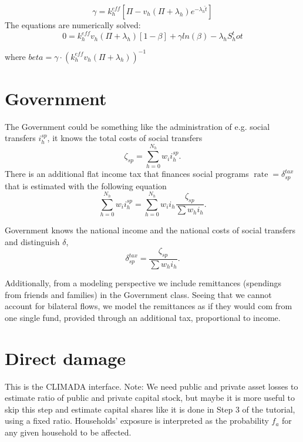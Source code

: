 \documentclass{article}
\begin{document}
\begin{equation}
\label{eq:kh}
\gamma = k_h^{eff} [\Pi - v_h(\Pi+\lambda_h)e^{-\lambda_h \hat{t}}]
\end{equation}
The equations are numerically solved:
\begin{equation}
\label{eq:kh}
0 = k_h^{eff} v_h (\Pi+\lambda_h)[1-\beta] + \gamma ln(\beta)-\lambda_h S_h^tot
\end{equation}

where $beta = \gamma \cdot (k_h^{eff} v_h (\Pi+\lambda_h))^{-1}$


\section{Government}
The Government could be something like the administration of e.g. social transfers $i_{h}^{sp}$, it knows the total costs of social transfers
\begin{equation}
  \label{eq:transfer_cost}
\zeta_{sp} = \sum_{h=0}^{N_h} w_ii_h^{sp}.
\end{equation}
There is an additional flat income tax that finances social programs $\operatorname{rate} = \delta_{sp}^{tax}$ that is estimated with the following equation
\begin{equation}
 \label{eq:income_tax}
\sum_{h=0}^{N_{h}} w_{i}i_{h}^{sp} = \sum_{h=0}^{N_h} w_ii_h\frac{\zeta_{sp}}{\sum w_hi_h}.
\end{equation}

Government knows the national income and the national costs of social transfers and distinguish $\delta$,
\begin{equation}
 \label{eq:deltasp}
\delta_{sp}^{tax} = \frac{\zeta_{sp}}{\sum w_hi_h}.
\end{equation}

Additionally, from a modeling perspective we include remittances (spendings from friends and families) in the Government class. Seeing that we cannot account for bilateral flows, we model the remittances as if they would com from one single fund, provided through an additional tax, proportional to income. 

\section{Direct damage}
This is the CLIMADA interface.
Note: We need public and private asset losses to estimate ratio of public and private capital stock, but maybe it is more useful to skip this step and estimate capital shares like it is done in Step 3 of the tutorial, using a fixed ratio.
Households' exposure is interpreted as the probability $f_{a}$ for any given household to be affected.
\end{document}
